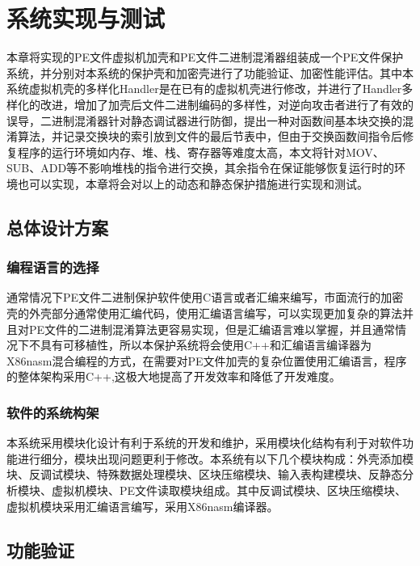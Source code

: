 \chapter{系统实现与测试}

本章将实现的PE文件虚拟机加壳和PE文件二进制混淆器组装成一个PE文件保护系统，并分别对本系统的保护壳和加密壳进行了功能验证、加密性能评估。其中本系统虚拟机壳的多样化Handler是在已有的虚拟机壳进行修改，并进行了Handler多样化的改进，增加了加壳后文件二进制编码的多样性，对逆向攻击者进行了有效的误导，二进制混淆器针对静态调试器进行防御，提出一种对函数间基本块交换的混淆算法，并记录交换块的索引放到文件的最后节表中，但由于交换函数间指令后修复程序的运行环境如内存、堆、栈、寄存器等难度太高，本文将针对MOV、SUB、ADD等不影响堆栈的指令进行交换，其余指令在保证能够恢复运行时的环境也可以实现，本章将会对以上的动态和静态保护措施进行实现和测试。


\section{总体设计方案}

\subsection{编程语言的选择}

通常情况下PE文件二进制保护软件使用C语言或者汇编来编写，市面流行的加密壳的外壳部分通常使用汇编代码，使用汇编语言编写，可以实现更加复杂的算法并且对PE文件的二进制混淆算法更容易实现，但是汇编语言难以掌握，并且通常情况下不具有可移植性，所以本保护系统将会使用C++和汇编语言编译器为X86nasm混合编程的方式，在需要对PE文件加壳的复杂位置使用汇编语言，程序的整体架构采用C++,这极大地提高了开发效率和降低了开发难度。

\subsection{软件的系统构架}

本系统采用模块化设计有利于系统的开发和维护，采用模块化结构有利于对软件功能进行细分，模块出现问题更利于修改。本系统有以下几个模块构成：外壳添加模块、反调试模块、特殊数据处理模块、区块压缩模块、输入表构建模块、反静态分析模块、虚拟机模块、PE文件读取模块组成。其中反调试模块、区块压缩模块、虚拟机模块采用汇编语言编写，采用X86nasm编译器。

\section{功能验证}

